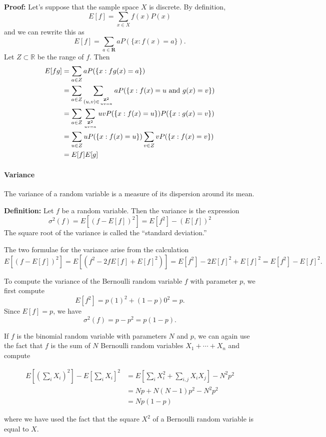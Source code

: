 \documentclass[
]{article}
\begin{document}
\textbf{Proof:} Let's suppose that the sample space \(X\) is discrete.
By definition, \[
E[f]=\sum_{x\in X}f(x)P(x)
\] and we can rewrite this as \[
E[f]=\sum_{a\in\mathbf{R}} aP(\{x: f(x)=a\}).
\] Let \(Z\subset\mathbb{R}\) be the range of \(f\). Then \begin{align*}
E[fg]&=\sum_{a\in Z} aP(\{x: fg(x)=a\}) \\
&=\sum_{a\in Z}\sum_{(u,v)\in\genfrac{}{}{0pt}{}{\mathbf{Z}^{2}}{uv=a}}aP(\{x:f(x)=u\hbox{\rm\ and\ }g(x)=v\}) \\
&=\sum_{a\in Z}\sum_{\genfrac{}{}{0pt}{}{\mathbf{Z}^{2}}{uv=a}}uvP(\{x:f(x)=u\})P(\{x:g(x)=v\}) \\
&=\sum_{u\in Z}uP(\{x:f(x)=u\})\sum_{v\in Z}vP(\{x:f(x)=v\}) \\
&=E[f]E[g] 
\end{align*}

\hypertarget{variance}{%
\paragraph{Variance}\label{variance}}

The variance of a random variable is a measure of its dispersion around
its mean.

\textbf{Definition:} Let \(f\) be a random variable. Then the variance
is the expression \[
\sigma^2(f) = E[(f-E[f])^2]=E[f^2]-(E[f])^2
\] The square root of the variance is called the ``standard deviation.''

The two formulae for the variance arise from the calculation \[
E[(f-E[f])^2]=E[(f^2-2fE[f]+E[f]^2)]=E[f^2]-2E[f]^2+E[f]^2=E[f^2]-E[f]^2.
\]

To compute the variance of the Bernoulli random variable \(f\) with
parameter \(p\), we first compute \[
E[f^2]=p(1)^2+(1-p)0^2=p.
\] Since \(E[f]=p\), we have \[
\sigma^2(f)=p-p^2=p(1-p).
\]

If \(f\) is the binomial random variable with parameters \(N\) and
\(p\), we can again use the fact that \(f\) is the sum of \(N\)
Bernoulli random variables \(X_1+\cdots+X_n\) and compute

\begin{align*}
E[(\sum_{i}X_i)^2]-E[\sum_{i} X_{i}]^2 &=E[\sum_{i} X_i^2+\sum_{i,j}X_{i}X_{j}]-N^2p^2\\
&=Np+N(N-1)p^2-N^2p^2 \\
&=Np(1-p)
\end{align*}

where we have used the fact that the square \(X^2\) of a Bernoulli
random variable is equal to \(X\).
\end{document}
